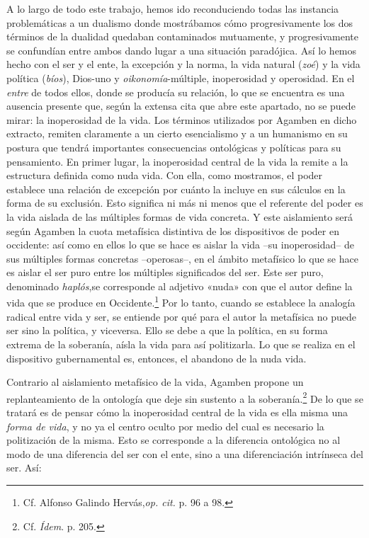 A lo largo de todo este trabajo, hemos ido reconduciendo todas las instancia problemáticas a un dualismo donde mostrábamos cómo progresivamente los dos términos de la dualidad quedaban contaminados mutuamente, y progresivamente se confundían entre ambos dando lugar a una situación paradójica. Así lo hemos hecho con el ser y el ente, la excepción y la norma, la vida natural (\emph{zoé}) y la vida política (\emph{bíos}), Dios-uno y \emph{oikonomía}-múltiple, inoperosidad y operosidad. En el \emph{entre} de todos ellos, donde se producía su relación, lo que se encuentra es una ausencia presente que, según la extensa cita que abre este apartado, no se puede mirar: la inoperosidad de la vida. Los términos utilizados por Agamben en dicho extracto, remiten claramente a un cierto esencialismo y a un humanismo en su postura que tendrá importantes consecuencias ontológicas y políticas para su pensamiento. En primer lugar, la inoperosidad central de la vida la remite a la estructura definida como nuda vida. Con ella, como mostramos, el poder establece una relación de excepción por cuánto la incluye en sus cálculos en la forma de su exclusión. Esto significa ni más ni menos que el referente del poder es la vida aislada de las múltiples formas de vida concreta. Y este aislamiento será según Agamben la cuota metafísica distintiva de los dispositivos de poder en occidente: así como en ellos lo que se hace es aislar la vida --su inoperosidad-- de sus múltiples formas concretas --operosas--, en el ámbito metafísico lo que se hace es aislar el ser puro entre los múltiples significados del ser. Este ser puro, denominado \emph{haplós},se corresponde al adjetivo «nuda» con que el autor define la vida que se produce en Occidente.\footnote{Cf. Alfonso Galindo Hervás,\emph{op. cit.} p. 96 a 98.} Por lo tanto, cuando se establece la analogía radical entre vida y ser, se entiende por qué para el autor la metafísica no puede ser sino la política, y viceversa. Ello se debe a que la política, en su forma extrema de la soberanía, aísla la vida para así politizarla. Lo que se realiza en el dispositivo gubernamental es, entonces, el abandono de la nuda vida.

Contrario al aislamiento metafísico de la vida, Agamben propone un replanteamiento de la ontología que deje sin sustento a la soberanía.\footnote{Cf. \emph{Ídem}. p. 205.} De lo que se tratará es de pensar cómo la inoperosidad central de la vida es ella misma una \emph{forma de vida}, y no ya el centro oculto por medio del cual es necesario la politización de la misma. Esto se corresponde a la diferencia ontológica no al modo de una diferencia del ser con el ente, sino a una diferenciación intrínseca del ser. Así:

